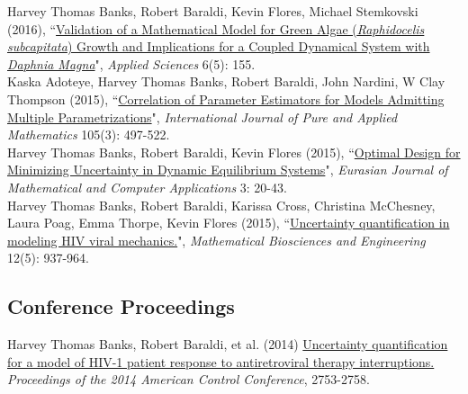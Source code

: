 \documentclass[10pt, a4paper]{article}
\newcommand{\years}[1]{\marginnote{\scriptsize #1}}
\begin{document}
\years{2016b} Harvey Thomas Banks, Robert Baraldi, Kevin Flores, Michael Stemkovski (2016), “\href{http://www.mdpi.com/2076-3417/6/5/155/htm}{Validation of a Mathematical Model for Green Algae (\emph{Raphidocelis subcapitata}) Growth and Implications for a Coupled Dynamical System with \emph{Daphnia Magna}}", \emph{Applied Sciences} 6(5): 155.\\
\years{2015a}Kaska Adoteye, Harvey Thomas Banks, Robert Baraldi, John Nardini, W Clay Thompson (2015), “\href{http://www.ijpam.eu/contents/2015-105-3/16/16.pdf}{Correlation of Parameter Estimators for Models Admitting Multiple Parametrizations}", \emph{International Journal of Pure and Applied Mathematics} 105(3): 497-522.\\
\years{2015b}Harvey Thomas Banks, Robert Baraldi, Kevin Flores (2015), “\href{http://www.ncsu.edu/crsc/reports/ftp/pdf/crsc-tr15-03.pdf}{Optimal Design for Minimizing Uncertainty in Dynamic Equilibrium Systems}", \emph{Eurasian Journal of Mathematical and Computer Applications} 3: 20-43.\\
\years{2015c}Harvey Thomas Banks, Robert Baraldi, Karissa Cross, Christina McChesney, Laura Poag, Emma Thorpe, Kevin Flores (2015), “\href{http://aimsciences.org/journals/displayArticlesnew.jsp?paperID=11300}{Uncertainty quantification in modeling HIV viral mechanics.}", \emph{Mathematical Biosciences and Engineering} 12(5): 937-964.\\

\subsection*{Conference Proceedings}
\noindent
\years{2014} Harvey Thomas Banks, Robert Baraldi, et al. (2014) \href{http://ieeexplore.ieee.org/stamp/stamp.jsp?tp=&arnumber=6858714&isnumber=6858556}{Uncertainty quantification for a model of HIV-1 patient response to antiretroviral therapy interruptions.} \emph{Proceedings of the 2014 American Control Conference}, 2753-2758.\\
\end{document}
